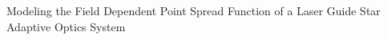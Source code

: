 Modeling the Field Dependent Point Spread Function of a Laser Guide Star Adaptive Optics System
\maketitle
